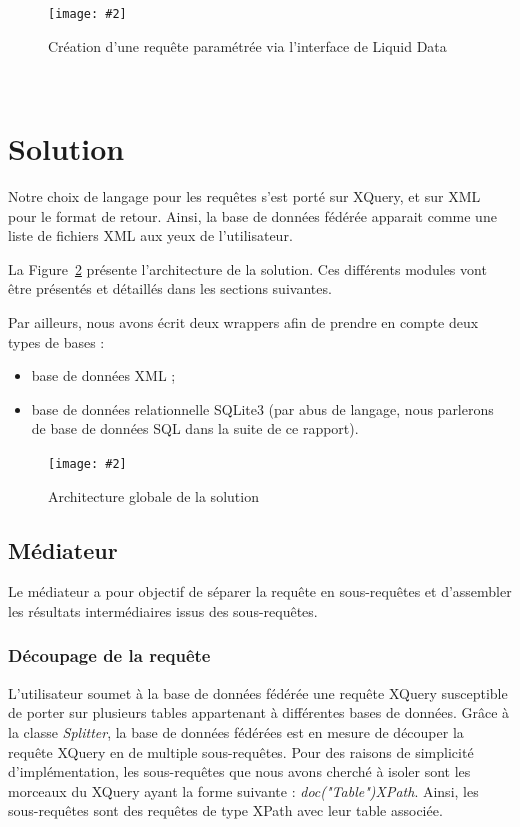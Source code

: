 \documentclass[a4paper,10pt]{article}
\newcommand{\fref}[1]{Figure~\ref{#1}}
\newcommand{\insertfigure}[4]{
\begin{figure}[ht!]
\begin{center}
\texttt{[image: \#2]}
\caption{#3}
\label{#4}
\end{center}
\end{figure}
}
\begin{document}
\insertfigure{0.8}{LiquidData.png}{Création d'une requête paramétrée via l'interface de Liquid Data}{fig:liquiddata}







\FloatBarrier
~~\\
\newpage
\section{Solution}

Notre choix de langage pour les requêtes s'est porté sur XQuery, et sur XML pour le format de retour. Ainsi, la base de données fédérée apparait comme une liste de fichiers XML aux yeux de l'utilisateur.


La \fref{fig:archiglo} présente l'architecture de la solution. Ces différents modules vont être présentés et détaillés dans les sections suivantes.

Par ailleurs, nous avons écrit deux wrappers afin de prendre en compte deux types de bases :
\begin{itemize}
\item base de données XML ;
\item base de données relationnelle SQLite3 (par abus de langage, nous parlerons de base de données SQL dans la suite de ce rapport).
\end{itemize}


\insertfigure{0.7}{Archi_Global.jpg}{Architecture globale de la solution}{fig:archiglo}





\subsection{Médiateur}

Le médiateur a pour objectif de séparer la requête en sous-requêtes et d'assembler les résultats intermédiaires issus des sous-requêtes.

\subsubsection{Découpage de la requête}

L'utilisateur soumet à la base de données fédérée une requête XQuery susceptible de porter sur plusieurs tables appartenant à différentes bases de données.
Grâce à la classe \emph{Splitter}, la base de données fédérées est en mesure de découper la requête XQuery en de multiple sous-requêtes. 
Pour des raisons de simplicité d'implémentation, les sous-requêtes que nous avons cherché à isoler sont les morceaux du XQuery ayant la forme suivante : \emph{doc("Table")XPath}.
Ainsi, les sous-requêtes sont des requêtes de type XPath avec leur table associée. 
\end{document}

